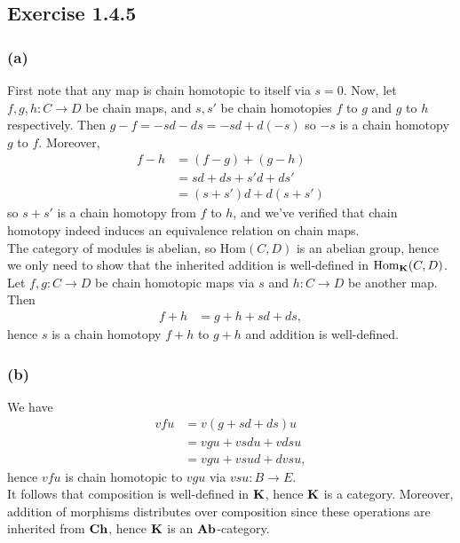 \documentclass{article}
\theoremstyle{definition}
\newcommand{\Hom}{\text{Hom}}
\newcommand{\catname}[1]{{\normalfont\textbf{#1}}}
\newcommand{\Ch}{\catname{Ch}}
\newcommand{\Ab}{\catname{Ab}}
\newcommand{\CK}{\catname{K}}
\begin{document}
\subsection*{Exercise 1.4.5}
\subsubsection*{(a)}

First note that any map is chain homotopic to itself via $s = 0$. Now, let $f,
g, h : C \to D$ be chain maps, and $s, s'$ be chain homotopies $f$ to $g$ and
$g$ to $h$ respectively. Then $g - f = -sd - ds = -sd + d(-s)$ so $-s$ is a
chain homotopy $g$ to $f$. Moreover,
\begin{align*}
	f - h
	&=
	(f - g) + (g - h) \\
	&=
	sd + ds + s'd + ds' \\
	&=
	(s + s')d + d(s + s')
\end{align*}
so $s + s'$ is a chain homotopy from $f$ to $h$, and we've verified that chain
homotopy indeed induces an equivalence relation on chain maps. \\

The category of modules is abelian, so $\Hom(C, D)$ is an abelian group, hence
we only need to show that the inherited addition is well-defined in
$\Hom_{\CK}(C, D)$. Let $f, g : C \to D$ be chain homotopic maps via $s$ and $h : C \to D$
be another map. Then 
\begin{align*}
	f + h
	&=
	g + h + sd + ds,
\end{align*} 
hence $s$ is a chain homotopy $f + h$ to $g + h$ and addition is well-defined.

\subsubsection*{(b)}

We have 
\begin{align*}
	vfu
	&=
	v(g + sd + ds)u \\
	&=
	vgu + vsdu + vdsu \\
	&=
	vgu + vsud + dvsu,
\end{align*}
hence $vfu$ is chain homotopic to $vgu$ via $vsu : B \to E$. \\

It follows that composition is well-defined in $\CK$, hence $\CK$ is a
category. Moreover, addition of morphisms distributes over composition since 
these operations are inherited from $\Ch$, hence $\CK$ is an $\Ab$-category.
\end{document}
